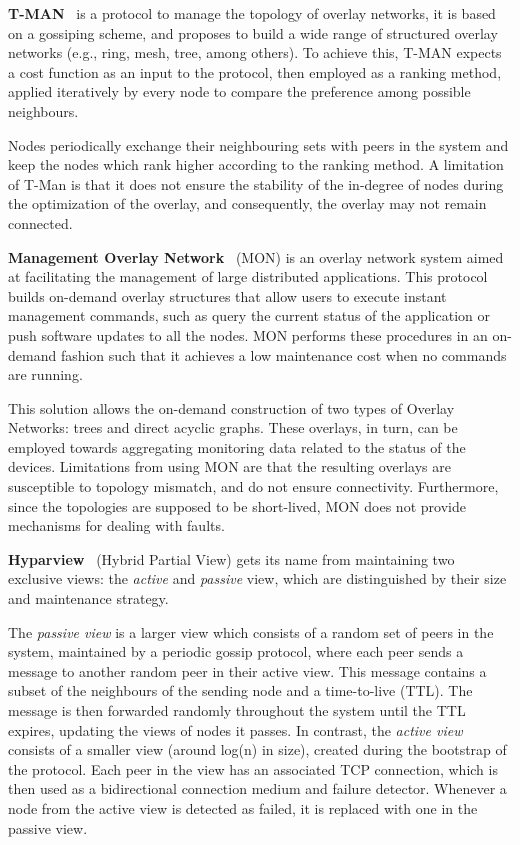 \textbf{T-MAN}~\cite{t-man} is a protocol to manage the topology of overlay networks, it is based on a gossiping scheme, and proposes to build a wide range of structured overlay networks (e.g., ring, mesh, tree, among others). To achieve this, T-MAN expects a cost function as an input to the protocol, then employed as a ranking method, applied iteratively by every node to compare the preference among possible neighbours. 

Nodes periodically exchange their neighbouring sets with peers in the system and keep the nodes which rank higher according to the ranking method. A limitation of T-Man is that it does not ensure the stability of the in-degree of nodes during the optimization of the overlay, and consequently, the overlay may not remain connected. 

\textbf{Management Overlay Network}~\cite{liang2005mon} (MON) is an overlay network system aimed at facilitating the management of large distributed applications. This protocol builds on-demand overlay structures that allow users to execute instant management commands, such as query the current status of the application or push software updates to all the nodes. MON performs these procedures in an on-demand fashion such that it achieves a low maintenance cost when no commands are running.

This solution allows the on-demand construction of two types of Overlay Networks: trees and direct acyclic graphs. These overlays, in turn, can be employed towards aggregating monitoring data related to the status of the devices. Limitations from using MON are that the resulting overlays are susceptible to topology mismatch, and do not ensure connectivity. Furthermore, since the topologies are supposed to be short-lived, MON does not provide mechanisms for dealing with faults.

\textbf{Hyparview}~\cite{Hyparview} (Hybrid Partial View) gets its name from maintaining two exclusive views: the \textit{active} and \textit{passive} view, which are distinguished by their size and maintenance strategy. 

The \textit{passive view} is a larger view which consists of a random set of peers in the system,  maintained by a periodic gossip protocol, where each peer sends a message to another random peer in their active view. This message contains a subset of the neighbours of the sending node and a time-to-live (TTL). The message is then forwarded randomly throughout the system until the TTL expires, updating the views of nodes it passes. In contrast, the \textit{active view} consists of a smaller view (around log(n) in size), created during the bootstrap of the protocol. Each peer in the view has an associated TCP connection, which is then used as a bidirectional connection medium and failure detector. Whenever a node from the active view is detected as failed, it is replaced with one in the passive view.

